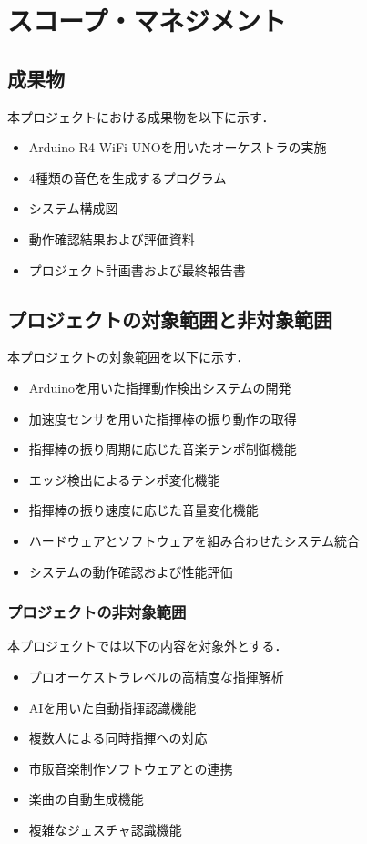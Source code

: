\documentclass[lualatex,book,paper=a4paper,jafontsize=11.5pt,jafontscale=1.05]{jlreq}
\begin{document}
\section{スコープ・マネジメント}
\subsection{成果物}
本プロジェクトにおける成果物を以下に示す．

\begin{itemize}
    \item Arduino R4 WiFi UNOを用いたオーケストラの実施
    \item 4種類の音色を生成するプログラム
    \item システム構成図
    \item 動作確認結果および評価資料
    \item プロジェクト計画書および最終報告書
\end{itemize}

\subsection{プロジェクトの対象範囲と非対象範囲}
本プロジェクトの対象範囲を以下に示す．

\begin{itemize}
    \item Arduinoを用いた指揮動作検出システムの開発
    \item 加速度センサを用いた指揮棒の振り動作の取得
    \item 指揮棒の振り周期に応じた音楽テンポ制御機能
    \item エッジ検出によるテンポ変化機能
    \item 指揮棒の振り速度に応じた音量変化機能
    \item ハードウェアとソフトウェアを組み合わせたシステム統合
    \item システムの動作確認および性能評価
\end{itemize}
\subsubsection{プロジェクトの非対象範囲}

本プロジェクトでは以下の内容を対象外とする．

\begin{itemize}
    \item プロオーケストラレベルの高精度な指揮解析
    \item AIを用いた自動指揮認識機能
    \item 複数人による同時指揮への対応
    \item 市販音楽制作ソフトウェアとの連携
    \item 楽曲の自動生成機能
    \item 複雑なジェスチャ認識機能
\end{itemize}
\end{document}
